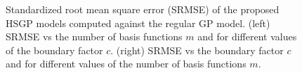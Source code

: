 \documentclass[]{interact}
\theoremstyle{plain}%
\theoremstyle{definition}
\theoremstyle{remark}
\begin{document}
\begin{figure}
\centering
{}
\caption{Standardized root mean square error (SRMSE) of the proposed HSGP models computed against the regular GP model. (left) SRMSE vs the number of basis functions $m$ and for different values of the boundary factor $c$. (right) SRMSE vs the boundary factor $c$ and for different values of the number of basis functions $m$. }
  \label{fig5_MSE_vs_J}
\end{figure}
\end{document}

